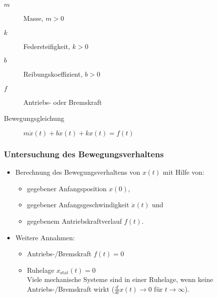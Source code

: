 			\begin{description}
				\item[\(m\)] Masse, \( m > 0 \)
				\item[\(k\)] Federsteifigkeit, \( k > 0 \)
				\item[\(b\)] Reibungskoeffizient, \( b > 0 \)
				\item[\(f\)] Antriebs- oder Bremskraft
				\item[Bewegungsgleichung] \( m\ddot{x}(t) + b\dot{x}(t) + kx(t) = f(t) \)
			\end{description}

			\subsubsection{Untersuchung des Bewegungsverhaltens} %
				\begin{itemize}
					\item Berechnung des Bewegungsverhaltens von \(x(t)\) mit Hilfe von:
						\begin{itemize}
							\item gegebener Anfangsposition \(x(0)\),
							\item gegebener Anfangsgeschwindigkeit \(\dot{x}(t)\) und
							\item gegebenem Antriebskraftverlauf \(f(t)\).
						\end{itemize}
					\item Weitere Annahmen:
						\begin{itemize}
							\item Antriebs-/Bremskraft \(f(t) = 0\)
							\item Ruhelage \( x _ \text{stat} (t) = 0 \) \\ Viele mechanische Systeme sind in einer Ruhelage, wenn keine Antriebs-/Bremskraft wirkt (\( \frac{d}{dt}x(t)  \rightarrow 0 \) für \( t \rightarrow \infty \)).
						\end{itemize}
				\end{itemize}

